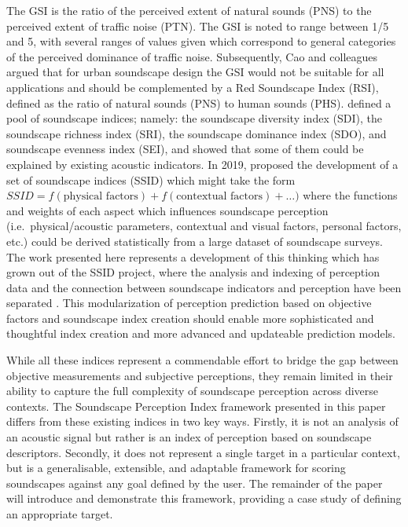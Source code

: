 \documentclass[
  authoryear,
  preprint,
  3p]{elsarticle}
\begin{document}
The GSI is the ratio of the perceived extent of natural sounds (PNS) to
the perceived extent of traffic noise (PTN). The GSI is noted to range
between 1/5 and 5, with several ranges of values given which correspond
to general categories of the perceived dominance of traffic noise.
Subsequently, Cao and colleagues \citep{Cao2020Red, Yang2022Effects}
argued that for urban soundscape design the GSI would not be suitable
for all applications and should be complemented by a Red Soundscape
Index (RSI), defined as the ratio of natural sounds (PNS) to human
sounds (PHS). \citet{Xiang2023Soundscape} defined a pool of soundscape
indices; namely: the soundscape diversity index (SDI), the soundscape
richness index (SRI), the soundscape dominance index (SDO), and
soundscape evenness index (SEI), and showed that some of them could be
explained by existing acoustic indicators. In 2019,
\citet{Kang2019Towards} proposed the development of a set of soundscape
indices (SSID) which might take the form
\(SSID = f(\text{physical factors}) + f(\text{contextual factors}) + \ldots)\)
where the functions and weights of each aspect which influences
soundscape perception (i.e.~physical/acoustic parameters, contextual and
visual factors, personal factors, etc.) could be derived statistically
from a large dataset of soundscape surveys. The work presented here
represents a development of this thinking which has grown out of the
SSID project, where the analysis and indexing of perception data and the
connection between soundscape indicators and perception have been
separated \citep{Mitchell2023conceptual}. This modularization of
perception prediction based on objective factors and soundscape index
creation should enable more sophisticated and thoughtful index creation
and more advanced and updateable prediction models.

While all these indices represent a commendable effort to bridge the gap
between objective measurements and subjective perceptions, they remain
limited in their ability to capture the full complexity of soundscape
perception across diverse contexts. The Soundscape Perception Index
framework presented in this paper differs from these existing indices in
two key ways. Firstly, it is not an analysis of an acoustic signal but
rather is an index of perception based on soundscape descriptors.
Secondly, it does not represent a single target in a particular context,
but is a generalisable, extensible, and adaptable framework for scoring
soundscapes against any goal defined by the user. The remainder of the
paper will introduce and demonstrate this framework, providing a case
study of defining an appropriate target.
\end{document}
